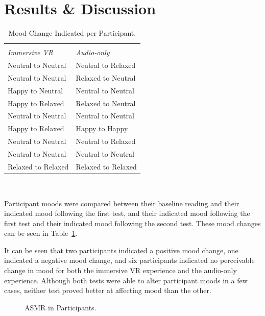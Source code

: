 \documentclass{sigchi}
\begin{document}
\section{Results \& Discussion}


\begin{table}[htb]
  \centering
  \begin{tabular}{l l}
    \toprule\\
    {\textit{Immersive VR}} & {\textit{Audio-only}}\\
    \midrule
    {Neutral to Neutral} & {Neutral to Relaxed} \\
    Neutral to Neutral & Relaxed to Neutral \\
    Happy to Neutral & Neutral to Neutral \\
    Happy to Relaxed & Relaxed to Neutral \\
    Neutral to Neutral & Neutral to Neutral \\
    Happy to Relaxed & Happy to Happy \\
    Neutral to Neutral & Neutral to Relaxed \\
    Neutral to Neutral & Neutral to Neutral \\
    Relaxed to Relaxed & Relaxed to Relaxed \\
     \bottomrule
  \end{tabular}
  \caption{Mood Change Indicated per Participant.}~\label{tab:mood_change}
\end{table}

Participant moods were compared between their baseline reading and their indicated mood following the first test, and their indicated mood following the first test and their indicated mood following the second test. These mood changes can be seen in Table~\ref{tab:mood_change}. 

It can be seen that two participants indicated a positive mood change, one indicated a negative mood change, and six participants indicated no perceivable change in mood for both the immersive VR experience and the audio-only experience. Although both tests were able to alter participant moods in a few cases, neither test proved better at affecting mood than the other.

\begin{figure}[htb]
\centering
{}
\caption{ASMR in Participants.}
\label{fig:experienced_asmr}
\end{figure}
\end{document}
